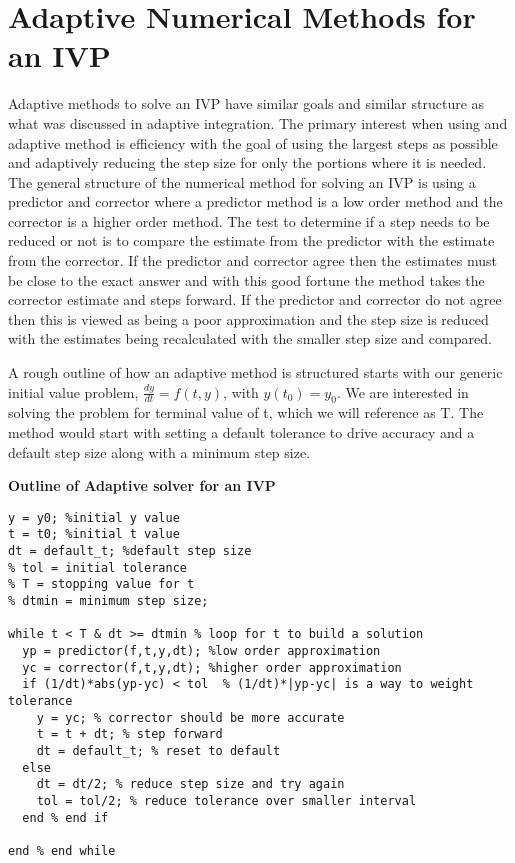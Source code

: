 \documentclass[twoside]{article}
\def\ds{\displaystyle}
\begin{document}
\section{Adaptive Numerical Methods for an IVP }
Adaptive methods to solve an IVP have similar goals and similar structure as what was discussed in adaptive integration. The primary interest when using and adaptive method is efficiency with the goal of using the largest steps as possible and adaptively reducing the step size for only the portions where it is needed. The general structure of the numerical method for solving an IVP is using a predictor and corrector where a predictor method is a low order method and the corrector is a higher order method. The test to determine if a step needs to be reduced or not is to compare the estimate from the predictor with the estimate from the corrector. If the predictor and corrector agree then the estimates must be close to the exact answer and with this good fortune the method takes the corrector estimate and steps forward. If the predictor and corrector do not agree then this is viewed as being a poor approximation and the step size is reduced with the estimates being recalculated with the smaller step size and compared.  \par \noindent
%
A rough outline of how an adaptive method is structured starts with our generic initial value problem, $\ds \frac {dy}{dt} = f(t,y)$, with $\ds y(t_0) = y_0$. We are interested in solving the problem for terminal value of t, which we will reference as T. The method would start with setting a default tolerance to drive accuracy and a default step size along with a minimum step size. \par {\bf Outline of Adaptive solver for an IVP}
\begin{verbatim}
y = y0; %initial y value
t = t0; %initial t value
dt = default_t; %default step size
% tol = initial tolerance
% T = stopping value for t
% dtmin = minimum step size;

while t < T & dt >= dtmin % loop for t to build a solution
  yp = predictor(f,t,y,dt); %low order approximation
  yc = corrector(f,t,y,dt); %higher order approximation
  if (1/dt)*abs(yp-yc) < tol  % (1/dt)*|yp-yc| is a way to weight tolerance
    y = yc; % corrector should be more accurate
    t = t + dt; % step forward
    dt = default_t; % reset to default
  else
    dt = dt/2; % reduce step size and try again
    tol = tol/2; % reduce tolerance over smaller interval
  end % end if
  
end % end while
\end{verbatim}
\end{document}
